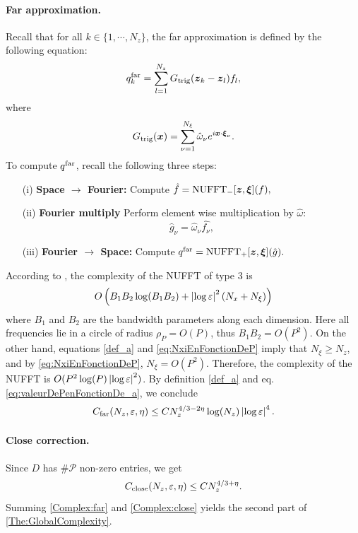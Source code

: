 \documentclass[smallextended]{svjour3}
\begin{document}
\paragraph{Far approximation.} Recall that for all $k \in \{1,\cdots,N_z\}$, the far approximation is defined by the following equation:
\[ q^{\text{far}}_k = \sum_{l=1}^{N_z} G_{\textup{trig}}(\boldsymbol{z}_k - \boldsymbol{z}_l) f_l,\]
where
\[ G_{\textup{trig}}(\boldsymbol{x}) = \sum_{\nu=1}^{N_\xi} \hat{\omega}_\nu e^{i \boldsymbol{x} \cdot \boldsymbol{\xi}_\nu}.\]
To compute $q^{\textup{far}}$, recall the following three steps:
\begin{itemize}
	\setlength{\itemindent}{2em}
	\item[(i)] \textbf{Space $\rightarrow$ Fourier: } Compute $\hat{f} = \textup{NUFFT}_-[\boldsymbol{z},\boldsymbol{\xi}](f),$
	\item[(ii)] \textbf{Fourier multiply} Perform element wise multiplication by $\hat{\omega}$: 
	\[\hat{g}_{\nu} = \hat{\omega}_\nu \hat{f_\nu},\]
	\item[(iii)] \textbf{Fourier $\rightarrow$ Space: } Compute $q^{\text{far}} =  \textup{NUFFT}_+[\boldsymbol{z},\boldsymbol{\xi}](\hat{g}).$
	\setlength{\itemindent}{0em}
\end{itemize}
According to \cite[Sec.	 4.3]{keiner2009using}, the complexity of the NUFFT of type 3 is 
\[O\left(B_1 B_2 \log (B_1 B_2) + \left\lvert \log\varepsilon \right\rvert^2(N_x + N_\xi)\right)\]
where $B_1$ and $B_2$ are the bandwidth parameters along each dimension. Here all frequencies lie in a circle of radius $\rho_P = O(P)$, thus $B_1B_2 = O(P^2)$. On the other hand, equations \eqref{def_a} and  \eqref{eq:NxiEnFonctionDeP} imply that $N_{\xi} \geq N_z$, and by \eqref{eq:NxiEnFonctionDeP}, $N_\xi = O(P^2)$. Therefore, the complexity of the NUFFT is $O(P^2 \log(P) \left\lvert \log \varepsilon \right\rvert^2)$. By definition \eqref{def_a} and eq. \eqref{eq:valeurDePenFonctionDe_a}, we conclude
\begin{equation}
	\label{Complex:far}
	C_{\textup{far}}(N_z,\varepsilon,\eta) \leq C N_z^{4/3 - 2\eta}\log(N_z) \left\lvert \log \varepsilon \right\rvert^{4} .
\end{equation}
\paragraph{Close correction.} Since $D$ has $\# \mathcal{P}$ non-zero entries, we get 
\begin{equation}
	\label{Complex:close}
	C_{\textup{close}}(N_z,\varepsilon,\eta) \leq C N_z^{4/3 + \eta}.
\end{equation}
Summing \eqref{Complex:far} and \eqref{Complex:close} yields the second part of \autoref{The:GlobalComplexity}. 
\end{document}

